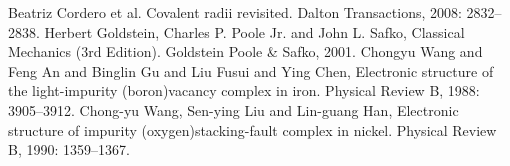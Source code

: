 \documentclass[12pt]{book}
\begin{document}
\begin{thebibliography}{99}
 Beatriz Cordero et al. Covalent radii revisited. Dalton Transactions, 2008: 2832--2838.
 Herbert Goldstein, Charles P. Poole Jr. and John L. Safko, Classical Mechanics (3rd Edition). Goldstein Poole \& Safko, 2001.
 Chongyu Wang and Feng An and Binglin Gu and Liu Fusui and Ying Chen, Electronic structure of the light-impurity (boron){\textendash}vacancy complex in iron. Physical Review B, 1988: 3905--3912.
 Chong-yu Wang, Sen-ying Liu and Lin-guang Han, Electronic structure of impurity (oxygen){\textendash}stacking-fault complex in nickel. Physical Review B, 1990: 1359--1367.
\end{thebibliography}
\end{document}

